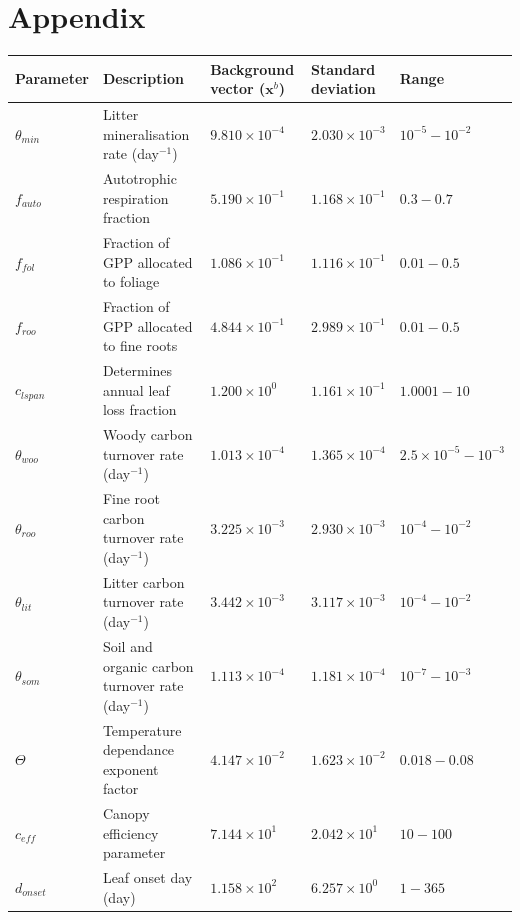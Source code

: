\documentclass[review]{elsarticle}
\begin{document}
\newpage

\section*{Appendix}

\begin{table}[ht] 
\begin{center}
	\begin{tabular}{| l | l | l | l | l |}
	\hline
	Parameter & Description & \pbox{7cm}{Background\\ vector ($\textbf{x}^{b}$)} & \pbox{7cm}{Standard \\deviation} & Range \\ \hline
$\theta_{min}$ & Litter mineralisation rate (day$^{-1}$) & $9.810\times 10^{-4}$ & $2.030\times 10^{-3}$ & $10^{-5} - 10^{-2}$ \\ \hline
$f_{auto}$ & Autotrophic respiration fraction & $5.190\times 10^{-1}$ & $1.168\times 10^{-1}$ & $0.3 - 0.7$  \\ \hline
$f_{fol}$ & Fraction of GPP allocated to foliage & $1.086\times 10^{-1}$ & $1.116\times 10^{-1}$ & $0.01-0.5$ \\ \hline
$f_{roo}$ & Fraction of GPP allocated to fine roots & $4.844\times 10^{-1}$ & $2.989\times 10^{-1}$ & $0.01-0.5$ \\ \hline
$c_{lspan}$ & Determines annual leaf loss fraction & $1.200\times 10^{0} $ & $1.161\times 10^{-1}$ & $1.0001 - 10$ \\ \hline
$\theta_{woo}$ & Woody carbon turnover rate (day$^{-1}$) & $1.013\times 10^{-4}$ & $1.365\times 10^{-4}$ & $2.5\times10^{-5} - 10^{-3}$ \\ \hline
$\theta_{roo}$ & Fine root carbon turnover rate (day$^{-1}$) & $3.225\times 10^{-3}$ & $2.930\times 10^{-3}$ & $10^{-4} - 10^{-2}$ \\ \hline
$\theta_{lit}$ & Litter carbon turnover rate (day$^{-1}$) & $3.442\times 10^{-3}$ & $3.117\times 10^{-3}$ & $10^{-4} - 10^{-2}$ \\ \hline
$\theta_{som}$ & Soil and organic carbon turnover rate (day$^{-1}$) & $1.113\times 10^{-4}$ & $1.181\times 10^{-4}$ & $10^{-7} - 10^{-3}$ \\ \hline
$\Theta$ & Temperature dependance exponent factor & $4.147\times 10^{-2}$ & $1.623\times 10^{-2}$ & $0.018 - 0.08$ \\ \hline
$c_{eff}$ & Canopy efficiency parameter & $7.144\times 10^{1}$ & $2.042\times 10^{1}$ & $10 - 100$ \\ \hline
$d_{onset}$ & Leaf onset day (day) & $1.158\times 10^{2}$ & $6.257\times 10^{0}$ & $1 - 365$ \\ \hline

\end{tabular}
\end{center}
\end{table}
\end{document}
